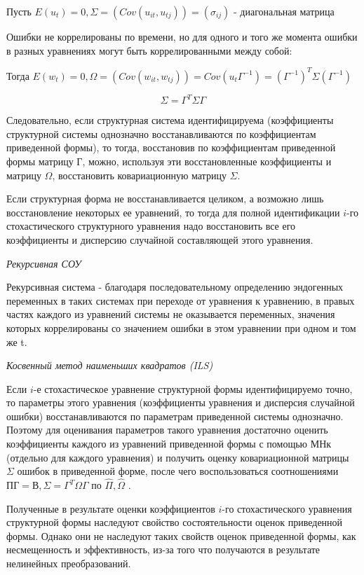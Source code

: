 \documentclass[a4paper,8pt]{article} %
\begin{document}
Пусть $E(u_t) = 0, \Sigma =(  Cov(u_{it}, u_{tj} )) = (\sigma_{ij}) $ - диагональная матрица


Ошибки не коррелированы по времени, но для одного и того же момента
ошибки в разных уравнениях могут быть коррелированными между собой:

Тогда   $E(w_t) = 0, \Omega  =(  Cov(w_{it}, w_{tj} )) =   Cov(u_{t} \Gamma^{-1}  ) =  (\Gamma^{-1})^T \Sigma (\Gamma^{-1})  $ 

$$\Sigma = \Gamma^T \Sigma \Gamma $$

Следовательно, если структурная система идентифицируема (коэффициенты структурной системы однозначно восстанавливаются по коэффициентам
приведенной формы), то тогда, восстановив по коэффициентам приведенной
формы матрицу $Г$, можно, используя эти восстановленные коэффициенты
и матрицу $\Omega$, восстановить ковариационную матрицу $\Sigma$.

Если структурная форма не восстанавливается целиком, а возможно лишь
восстановление некоторых ее уравнений, то тогда для полной идентификации $i$-го стохастического структурного уравнения надо восстановить все его коэффициенты и дисперсию случайной составляющей этого уравнения. 


\textit{Рекурсивная  СОУ }

Рекурсивная система - благодаря последовательному определению эндогенных переменных в таких системах при переходе
от уравнения к уравнению, в правых частях каждого из уравнений
системы не оказывается переменных, значения которых коррелированы со значением ошибки в этом уравнении при одном и том же t.

\textit{Косвенный метод наименьших квадратов (ILS)}

Если $i$-е стохастическое уравнение структурной формы идентифицируемо
точно, то параметры этого уравнения (коэффициенты уравнения и дисперсия
случайной ошибки) восстанавливаются по параметрам приведенной системы
однозначно. Поэтому для оценивания параметров такого уравнения достаточно оценить коэффициенты каждого из уравнений приведенной формы
с помощью МНк (отдельно для каждого уравнения) и получить оценку ковариационной матрицы $\Sigma$ ошибок в приведенной форме, после
чего воспользоваться соотношениями $ПГ = В, \Sigma = \Gamma^T \Omega \Gamma $ по $\hat{\Pi}, \hat{\Omega}$ . 

Полученные в результате оценки коэффициентов $i$-го
стохастического уравнения структурной формы наследуют свойство состоятельности оценок приведенной формы. Однако они не наследуют таких
свойств оценок приведенной формы, как несмещенность и эффективность,
из-за того что получаются в результате нелинейных преобразований.
\end{document}
